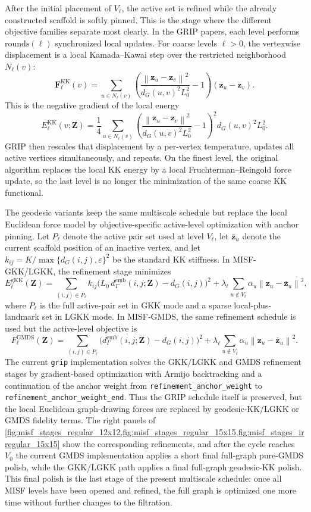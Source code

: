 \documentclass[11pt]{article}
\newcommand{\bz}{\mathbf{z}}
\newcommand{\bZ}{\mathbf{Z}}
\newcommand{\norm}[1]{\left\|#1\right\|}
\newcommand{\demb}{d^{\mathrm{emb}}}
\begin{document}
After the initial placement of $V_\ell$, the active set is refined while the
already constructed scaffold is softly pinned.  This is the stage where the
different objective families separate most clearly.  In the GRIP papers, each
level performs $\mathrm{rounds}(\ell)$ synchronized local updates.  For coarse levels
$\ell > 0$, the vertexwise displacement is a local Kamada--Kawai step over the
restricted neighborhood $N_\ell(v)$:
\[
  \mathbf{F}^{\mathrm{KK}}_\ell(v)
  =
  \sum_{u \in N_\ell(v)}
  \left(
    \frac{\norm{\bz_u - \bz_v}^2}
         {d_G(u,v)^2 L_0^2}
    - 1
  \right)
  (\bz_u - \bz_v).
\]
This is the negative gradient of the local energy
\[
  E^{\mathrm{KK}}_\ell(v;\bZ)
  =
  \frac{1}{4}
  \sum_{u \in N_\ell(v)}
  \left(
    \frac{\norm{\bz_u - \bz_v}^2}
         {d_G(u,v)^2 L_0^2}
    - 1
  \right)^2
  d_G(u,v)^2 L_0^2.
\]
GRIP then rescales that displacement by a per-vertex temperature, updates all
active vertices simultaneously, and repeats.  On the finest level, the original
algorithm replaces the local KK energy by a local Fruchterman--Reingold force
update, so the last level is no longer the minimization of the same coarse KK
functional.

The geodesic variants keep the same multiscale schedule but replace the local
Euclidean force model by objective-specific active-level optimization with
anchor pinning.  Let $P_\ell$ denote the active pair set used at level
$V_\ell$, let $\bar{\bz}_u$ denote the current scaffold position of an inactive
vertex, and let $k_{ij} = K / \max\{d_G(i,j), \varepsilon\}^2$ be the standard
KK stiffness.  In MISF-GKK/LGKK, the refinement stage minimizes
\[
  E^{\mathrm{gKK}}_\ell(\bZ)
  =
  \sum_{(i,j)\in P_\ell}
  k_{ij}
  \bigl(
    L_0\,\demb_{\Gamma}(i,j;\bZ) - d_G(i,j)
  \bigr)^2
  +
  \lambda_\ell
  \sum_{u \notin V_\ell}
  \alpha_u \norm{\bz_u - \bar{\bz}_u}^2,
\]
where $P_\ell$ is the full active-pair set in GKK mode and a sparse
local-plus-landmark set in LGKK mode.  In MISF-GMDS, the same refinement
schedule is used but the active-level objective is
\[
  F^{\mathrm{GMDS}}_\ell(\bZ)
  =
  \sum_{(i,j)\in P_\ell}
  \bigl(
    \demb_{\Gamma}(i,j;\bZ) - d_G(i,j)
  \bigr)^2
  +
  \lambda_\ell
  \sum_{u \notin V_\ell}
  \alpha_u \norm{\bz_u - \bar{\bz}_u}^2.
\]
The current \texttt{grip} implementation solves the GKK/LGKK and GMDS
refinement stages by gradient-based optimization with Armijo backtracking and a
continuation of the anchor weight from
\texttt{refinement\_anchor\_weight} to
\texttt{refinement\_anchor\_weight\_end}.  Thus the GRIP schedule itself is
preserved, but the local Euclidean graph-drawing forces are replaced by
geodesic-KK/LGKK or GMDS fidelity terms.  The right panels of
\cref{fig:misf_stages_regular_12x12,fig:misf_stages_regular_15x15,fig:misf_stages_irregular_15x15}
show the corresponding refinements, and after the cycle reaches $V_0$ the
current GMDS implementation applies a short final full-graph pure-GMDS polish,
while the GKK/LGKK path applies a final full-graph geodesic-KK polish.
This final polish is the last stage of the present multiscale schedule: once
all MISF levels have been opened and refined, the full graph is optimized one
more time without further changes to the filtration.
\end{document}
